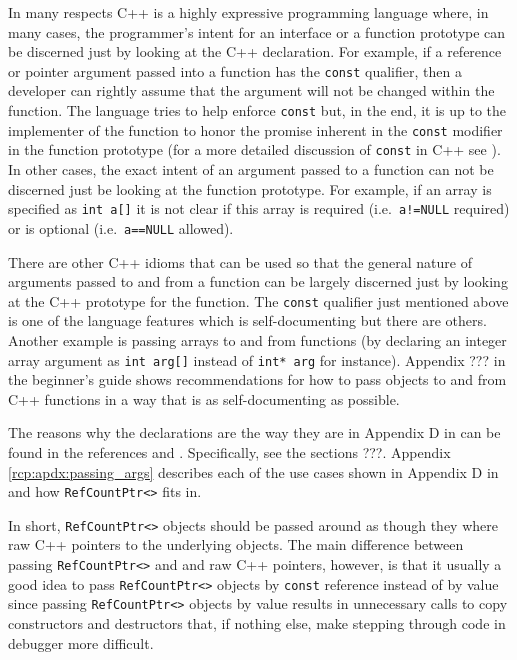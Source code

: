 In many respects C++ is a highly expressive programming language
where, in many cases, the programmer's intent for an interface or a
function prototype can be discerned just by looking at the C++
declaration.  For example, if a reference or pointer argument passed
into a function has the {}\texttt{const} qualifier, then a developer
can rightly assume that the argument will not be changed within the
function.  The language tries to help enforce {}\texttt{const} but, in
the end, it is up to the implementer of the function to honor the
promise inherent in the {}\texttt{const} modifier in the function
prototype (for a more detailed discussion of {}\texttt{const} in C++
see {}\cite[Section 10.2.7.1]{ref:stroustrup_2000}).  In other cases,
the exact intent of an argument passed to a function can not be
discerned just be looking at the function prototype.  For example, if
an array is specified as {}\texttt{int a[]} it is not clear if this
array is required (i.e.~{}\texttt{a!=NULL} required) or is optional
(i.e.~{}\texttt{a==NULL} allowed).

There are other C++ idioms that can be used so that the general nature
of arguments passed to and from a function can be largely discerned
just by looking at the C++ prototype for the function.  The
{}\texttt{const} qualifier just mentioned above is one of the language
features which is self-documenting but there are others.  Another
example is passing arrays to and from functions (by declaring an
integer array argument as {}\texttt{int arg[]} instead of
{}\texttt{int* arg} for instance).  Appendix ??? in the beginner's
guide {}\cite{ref:RefCountPtrBeginnersGuide} shows recommendations for
how to pass objects to and from C++ functions in a way that is as
self-documenting as possible.

The reasons why the declarations are the way they are in Appendix D in
{}\cite{ref:RefCountPtrBeginnersGuide} can be found in the references
{}\cite{ref:stroustrup_2000} and {}\cite{ref:meyers_1994}.
Specifically, see the sections ???.  Appendix
{}\ref{rcp:apdx:passing_args} describes each of the use cases shown in
Appendix D in {}\cite{ref:RefCountPtrBeginnersGuide} and how
{}\texttt{RefCountPtr<>} fits in.

In short, {}\texttt{RefCountPtr<>} objects should be passed around as
though they where raw C++ pointers to the underlying objects.  The
main difference between passing {}\texttt{RefCountPtr<>} and and raw
C++ pointers, however, is that it usually a good idea to pass
{}\texttt{RefCountPtr<>} objects by {}\texttt{const} reference instead
of by value since passing {}\texttt{RefCountPtr<>} objects by value
results in unnecessary calls to copy constructors and destructors
that, if nothing else, make stepping through code in debugger more
difficult.

